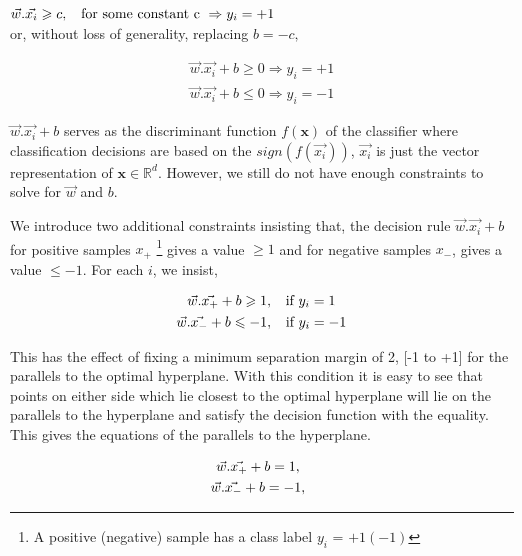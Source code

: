 \documentclass[final,3p,times,twocolumn]{elsarticle}
\begin{document}
$\vec{w}.\vec{x_{i}} \geqslant c, \hspace{2mm} \textrm{ for some constant c } \Rightarrow y_{i} = +1 $ \\

or, without loss of generality, replacing $b = -c,$

\begin{align}
\vec{w}.\vec{x_{i}} + b \geqslant 0 \Rightarrow y_{i} = +1 \\
\vec{w}.\vec{x_{i}} + b \leqslant 0 \Rightarrow y_{i} = -1 
\end{align}

$\vec{w}.\vec{x_{i}} + b$ serves as the discriminant function $f(\textbf{x})$ of the classifier where classification decisions are based on the $sign(f(\vec{x_{i}}))$, $\vec{x_{i}}$ \textrm{ is just the vector representation of } $\textbf{x} \in \mathbb{R}^d$. However, we still do not have enough constraints to solve for $\vec{w}$ and $b$.

We introduce two additional constraints insisting that, the decision rule  $\vec{w}.\vec{x_{i}} + b$ for positive samples $x_{+}$ \footnote{A positive (negative) sample has a class label $y_{i}$ = $+1 (-1)$} gives a value  $\geqslant 1$ and for negative samples $x_{-}$, gives a value $\leqslant -1$. For each $i$, we insist, 

\begin{gather}
\label{df_11}
\vec{w}.\vec{x_{+}} + b \geqslant 1,\hspace{2mm} \textrm{ if } y_{i} = 1 \\
\vec{w}.\vec{x_{-}} + b \leqslant -1,\hspace{2mm} \textrm{ if } y_{i} = -1
\label{df_12}
\end{gather}

This has the effect of fixing a minimum separation margin of 2, [-1 to +1] for the parallels to the optimal hyperplane. With this condition it is easy to see that points on either side which lie closest to the optimal hyperplane will lie on the parallels to the hyperplane and satisfy the decision function with the equality. This gives the equations of the parallels to the hyperplane. 

\begin{gather}
\vec{w}.\vec{x_{+}} + b = 1,\hspace{2mm}  \\
\vec{w}.\vec{x_{-}} + b = -1,\hspace{2mm} 
\end{gather}
\end{document}

